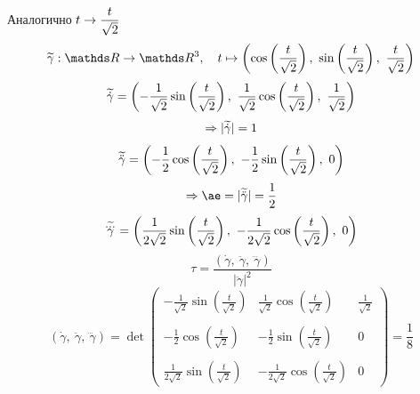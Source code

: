 \documentclass[main]{subfiles}
\begin{document}
    \begin{sol}
        Аналогично $t \rightarrow \dfrac{t}{\sqrt{2}}$
        \[\w{\gamma}: \R \ra \R^3,\q t \mapsto
        \Br{
            \cos\Br{\frac{t}{\sqrt{2}}},\
            \sin\Br{\frac{t}{\sqrt{2}}},\
            \frac{t}{\sqrt{2}}
        }\]
        \[\widetilde{\dot{\gamma}} =
        \left(
            -\frac{1}{\sqrt{2}} \sin\left(\frac{t}{\sqrt{2}}\right),\
            \frac{1}{\sqrt{2}} \cos\left(\frac{t}{\sqrt{2}}\right),\
            \frac{1}{\sqrt{2}}
        \right)\]
        \[\Rightarrow |\widetilde{\dot{\gamma}}|=1\]
        \[\widetilde{\ddot{\gamma}} =
        \left(
            -\frac{1}{2} \cos\left(\frac{t}{\sqrt{2}}\right),\
            -\frac{1}{2} \sin\left(\frac{t}{\sqrt{2}}\right),\
            0
        \right)\]
        \[\Ra \ae = |\w{\ddot{\gamma}}| = \frac{1}{2}\]
        \[\widetilde{\overset{{}_{\displaystyle ...}}{\gamma}} =
        \left(
            \frac{1}{2 \sqrt{2}} \sin\left(\frac{t}{\sqrt{2}}\right),\
            -\frac{1}{2 \sqrt{2}} \cos\left(\frac{t}{\sqrt{2}}\right),\
            0
        \right)\]
        \[\tau = \dfrac{(\dot{\gamma},\ \ddot{\gamma},\ \dddot{\gamma})}{|\ddot{\gamma}|^2}\]
        \[(\dot{\gamma},\ \ddot{\gamma},\ \dddot{\gamma}) = \det
        \begin{pmatrix}
          -\frac{1}{\sqrt{2}} \sin(\frac{t}{\sqrt{2}}) & \frac{1}{\sqrt{2}} \cos(\frac{t}{\sqrt{2}}) & \frac{1}{\sqrt{2}}\\ \\
          -\frac{1}{2} \cos(\frac{t}{\sqrt{2}}) & -\frac{1}{2} \sin(\frac{t}{\sqrt{2}}) & 0\\ \\
          \frac{1}{2 \sqrt{2}} \sin(\frac{t}{\sqrt{2}}) & -\frac{1}{2 \sqrt{2}} \cos(\frac{t}{\sqrt{2}}) & 0
        \end{pmatrix} = \frac{1}{8}\]
    \end{sol}
\end{document}
